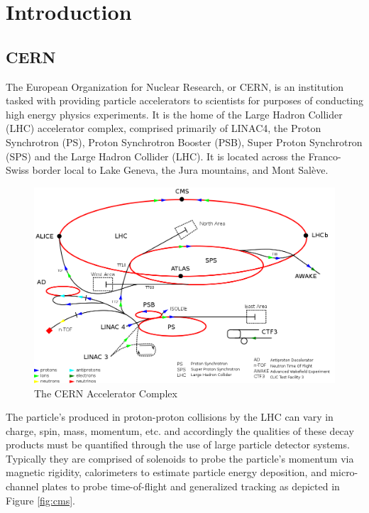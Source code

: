 \chapter{Introduction}

\section{CERN}

The European Organization for Nuclear Research, or CERN, is an institution tasked with providing particle accelerators to scientists for purposes of conducting high energy physics experiments. It is the home of the Large Hadron Collider (LHC) accelerator complex, comprised primarily of LINAC4, the Proton Synchrotron (PS), Proton Synchrotron Booster (PSB), Super Proton Synchrotron (SPS) and the Large Hadron Collider (LHC). It is located across the Franco-Swiss border local to Lake Geneva, the Jura mountains, and Mont Salève.

\begin{figure}
    \centering
    \includegraphics{figs/1024px-Cern-accelerator-complex.svg.png}
    \caption{The CERN Accelerator Complex}
    \label{fig:cern}
\end{figure}

The particle's produced in proton-proton collisions by the LHC can vary in charge, spin, mass, momentum, etc. and accordingly the qualities of these decay products must be quantified through the use of large particle detector systems. Typically they are comprised of solenoids to probe the particle's momentum via magnetic rigidity, calorimeters to estimate particle energy deposition, and micro-channel plates to probe time-of-flight and generalized tracking as depicted in Figure \ref{fig:cms}.

